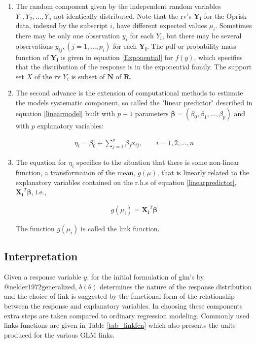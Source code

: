 \documentclass[]{article}
\begin{document}
\begin{enumerate}
\item The random component given by the independent random variables $Y_1, Y_2, \ldots, Y_n $ not identically distributed. Note that the rv's $\mathbf{Y_i}$ for the Oprisk data, indexed by the subscript $i$, have different expected values $\mu_i$. Sometimes there may be only one observation $y_i$ for each $Y_i$, but there may be several observations $y_{ij}, (j=1,\ldots,p_i)$ for each $\mathbf{Y_i}$. The pdf or probability mass function of $\mathbf{Y_i}$ is given in equation \ref{Exponential} for $f(y)$, which specifies that the distribution of the response is in the exponential family. The support set $X$ of the rv $Y_i$ is subset of $\mathbf{N}$ of $\mathbf{R}$. 

\item The second advance is the extension of computational methods to estimate the models systematic component, so called the "linear predictor" described in equation \ref{linearmodel} built with $p+1$ parameters $\mathbf{\beta} = (\beta_0,\beta_1,\ldots,\beta_p)$ and with $p$ explanatory variables:

\singlespacing
\begin{eqnarray}\label{linearpredictor}
\eta_i = \beta_0 + \sum_{j=1}^{p}\beta_jx_{ij}, \qquad i = 1,2,\ldots,n
\end{eqnarray}
\doublespacing

\item The equation for $\eta_i$ specifies to the situation that there is some non-linear function, a transformation of the mean, $g(\mu)$, that is linearly related to the explanatory variables contained on the r.h.s of equation \ref{linearpredictor}, $\mathbf{X_i}^T\mathbf{\beta}$, i.e.,

\singlespacing
\begin{eqnarray}
g(\mu_i) = \mathbf{X_i}^T\mathbf{\beta}
\end{eqnarray}
\doublespacing

The function $g(\mu_i)$ is called the link function.
\end{enumerate}

\subsection{Interpretation}

Given a response variable \(y\), for the initial formulation of glm's by
@nelder1972generalized, \(b(\theta)\) determines the nature of the
response distribution and the choice of link is suggested by the
functional form of the relationship between the response and explanatory
variables. In choosing these components extra steps are taken compared
to ordinary regression modeling. Commonly used links functions are given
in Table \ref{tab_linkfcn} which also presents the units produced for
the various GLM links.
\end{document}
